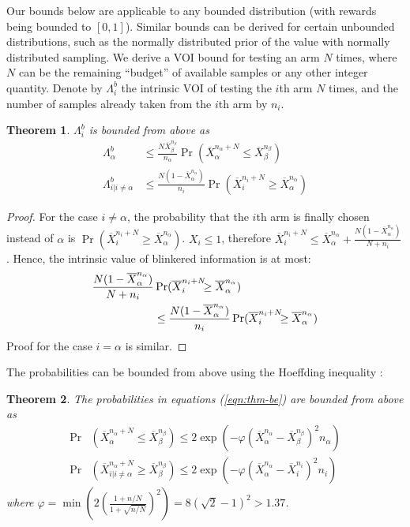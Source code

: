 \documentclass[]{article}
\newtheorem{thm}{Theorem}
\begin{document}
Our bounds below are applicable to any bounded distribution (with rewards being
bounded to $[0,1]$). Similar
bounds can be derived for certain unbounded distributions, such as the
normally distributed prior of the value with normally distributed
sampling.
We derive a VOI bound for testing an arm $N$ times,
where $N$ can be the remaining ``budget'' of available samples or
any other integer quantity.
Denote by  $\Lambda_i^b$ the intrinsic VOI of testing the $i$th arm
$N$ times, and the number of
samples already taken from the $i$th arm by $n_i$.
\begin{thm} $\Lambda_i^b$ is bounded from above as
\begin{align}
\label{eqn:thm-be}
  \Lambda_\alpha^b&\le \frac {N \overline X_\beta^{n_\beta}} {n_\alpha} \Pr(\overline X_\alpha^{n_\alpha+N}\le\overline X_\beta^{n_\beta})\nonumber\\
\Lambda_{i|i\ne\alpha}^b&\le \frac {N(1-\overline X_\alpha^{n_\alpha})} {n_i}\Pr(\overline   X_i^{{n_i}+N}\ge\overline X_\alpha^{n_\alpha})
\end{align}
\label{thm:be}
\end{thm}
\vspace{-2em}
\begin{proof} For the case $i\ne \alpha$, the probability that the
  $i$th arm is finally chosen instead of $\alpha$ is
  $\Pr(\overline X_i^{n_i+N} \ge \overline X_\alpha^{n_\alpha})$. $X_i \le 1$,
  therefore $\overline X_i^{n_i+N}\le \overline
  X_\alpha^{n_\alpha}+\frac {N(1-\overline X_\alpha^{n_\alpha})} {N+n_i}$. Hence, the intrinsic value of blinkered
  information is at most: 
\begin{align}
\label{eq:simplistic}
\frac{ N(1-\overline  X_\alpha^{n_\alpha})}
  {N+n_i}&\Pr(\overline X_i^{{n_i}+N}\hspace{-0.5em}\ge\overline X_\alpha^{n_\alpha})\nonumber \\
&\le\frac{ N(1-\overline  X_\alpha^{n_\alpha})}
{n_i}\Pr(\overline X_i^{{n_i}+N}\hspace{-0.5em}\ge\overline X_\alpha^{n_\alpha})
\end{align}
  Proof for the case $i=\alpha$ is similar.
\end{proof}

The probabilities can be bounded from above using the
Hoeffding inequality \citep{Hoeffding.ineq}:
\begin{thm} The probabilities in equations (\ref{eqn:thm-be}) are bounded from above as
\begin{align}
  \label{eqn:probound-blnk-hoeffding}
  \Pr&(\overline X_\alpha^{{n_\alpha}+N} \le \overline X_\beta^{n_\beta})
  \le 2\exp\left(- \varphi (\overline X_\alpha^{n_\alpha} - \overline X_\beta^{n_\beta})^2 n_\alpha
  \right)\nonumber\\
  \Pr&(\overline X_{i|i\ne\alpha}^{n_\alpha+N} \ge \overline X_\beta^{n_\beta})
  \le 2\exp\left(- \varphi (\overline X_\alpha^{n_\alpha} -\overline  X_i^{n_i})^2 n_i \right)
\end{align}
where $\varphi=\min \left(2(\frac {1+n/N} {1+\sqrt {n/N}})^2\right)=8(\sqrt 2 - 1)^2 > 1.37$.
\label{thm:hoeffding-prob-bounds}
\end{thm}
\end{document}
